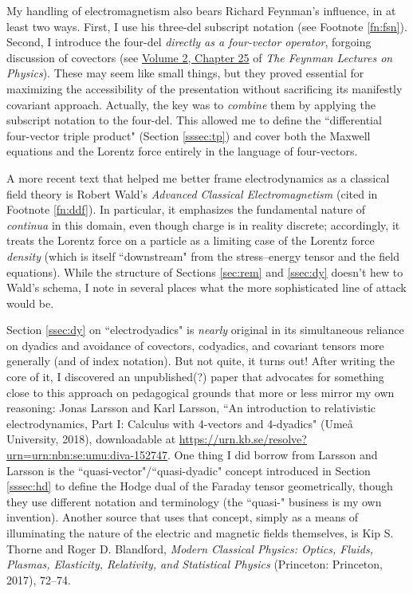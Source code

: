 \documentclass[12pt]{article}
\begin{document}
My handling of electromagnetism also bears Richard Feynman's influence, in at least two ways. First, I use his three-del subscript notation (see Footnote \ref{fn:fsn}). Second, I introduce the four-del \emph{directly as a four-vector operator}, forgoing discussion of covectors (see \href{http://www.feynmanlectures.caltech.edu/II_25.html#Ch25-S3}{Volume 2, Chapter 25} of \emph{The Feynman Lectures on Physics}). These may seem like small things, but they proved essential for maximizing the accessibility of the presentation without sacrificing its manifestly covariant approach. Actually, the key was to \emph{combine} them by applying the subscript notation to the four-del. This allowed me to define the ``differential four-vector triple product" (Section \ref{sssec:tp}) and cover both the Maxwell equations and the Lorentz force entirely in the language of four-vectors.

A more recent text that helped me better frame electrodynamics as a classical field theory is Robert Wald's \emph{Advanced Classical Electromagnetism} (cited in Footnote \ref{fn:ddf}). In particular, it emphasizes the fundamental nature of \emph{continua} in this domain, even though charge is in reality discrete; accordingly, it treats the Lorentz force on a particle as a limiting case of the Lorentz force \emph{density} (which is itself ``downstream" from the stress--energy tensor and the field equations). While the structure of Sections \ref{sec:rem} and \ref{ssec:dy} doesn't hew to Wald's schema, I note in several places what the more sophisticated line of attack would be.

Section \ref{ssec:dy} on ``electrodyadics" is \emph{nearly} original in its simultaneous reliance on dyadics and avoidance of covectors, codyadics, and covariant tensors more generally (and of index notation). But not quite, it turns out! After writing the core of it, I discovered an unpublished(?) paper that advocates for something close to this approach on pedagogical grounds that more or less mirror my own reasoning: Jonas Larsson and Karl Larsson, ``An introduction to relativistic electrodynamics, Part I: Calculus with 4-vectors and 4-dyadics" (Ume\r{a} University, 2018), downloadable at {\url{https://urn.kb.se/resolve?urn=urn:nbn:se:umu:diva-152747}}. One thing I did borrow from Larsson and Larsson is the ``quasi-vector"/``quasi-dyadic" concept introduced in Section \ref{sssec:hd} to define the Hodge dual of the Faraday tensor geometrically, though they use different notation and terminology (the ``quasi-" business is my own invention). Another source that uses that concept, simply as a means of illuminating the nature of the electric and magnetic fields themselves, is Kip S. Thorne and Roger D. Blandford, \emph{Modern Classical Physics: Optics, Fluids, Plasmas, Elasticity, Relativity, and Statistical Physics} (Princeton: Princeton, 2017), 72--74.
\end{document}
